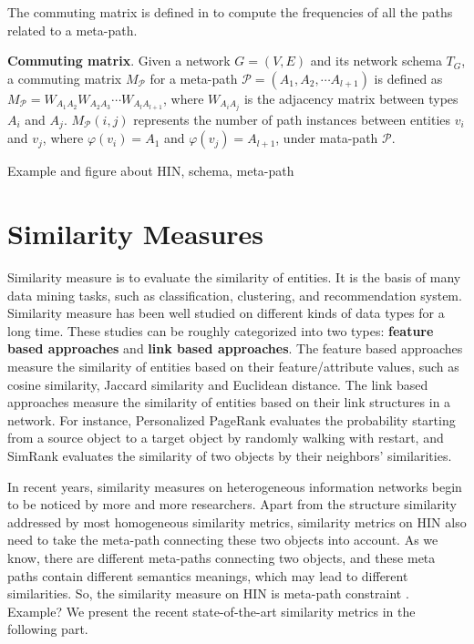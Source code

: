 \documentclass{acm_proc_article-csis8101}
\begin{document}
The commuting matrix is defined in \cite{sun2011pathsim} to compute the frequencies of all the paths related to a meta-path.

\begin{definition}
{\bf Commuting matrix}. Given a network $G=(V,E)$ and its network schema $T_{G}$, a commuting matrix $M_{\mathcal{P}}$ for a meta-path $\mathcal{P}=(A_{1}, A_{2}, \cdots A_{l+1})$ is defined as $M_{\mathcal{P}}=W_{A_{1}A_{2}}W_{A_{2}A_{3}} \cdots W_{A_{l}A_{l+1}}$, where $W_{A_{i}A_{j}}$ is the adjacency matrix between types $A_{i}$ and $A_{j}$. $M_{\mathcal{P}}(i, j)$ represents the number of path instances between entities $v_{i}$ and $v_{j}$, where $\varphi(v_{i})=A_{1}$ and $\varphi(v_{j})=A_{l+1}$, under mata-path $\mathcal{P}$.
\end{definition}

\begin{example}
{\color{red} Example and figure about HIN, schema, meta-path}
\end{example}

\section{Similarity Measures}

Similarity measure is to evaluate the similarity of entities. It is the basis of many data mining tasks, such as classification, clustering, and recommendation system. Similarity measure has been well studied on different kinds of data types for a long time. These studies can be roughly categorized into two types: {\bf feature based approaches} and {\bf link based approaches}. The feature based approaches measure the similarity of entities based on their feature/attribute values, such as cosine similarity, Jaccard similarity and Euclidean distance. The link based approaches measure the similarity of entities based on their link structures in a network. For instance, Personalized PageRank \cite{jeh2003scaling} evaluates the probability starting from a source object to a target object by randomly walking with restart, and SimRank\cite{jeh2002simrank} evaluates the similarity of two objects by their neighbors' similarities.

In recent years, similarity measures on heterogeneous information networks begin to be noticed by more and more researchers. Apart from the structure similarity addressed by most homogeneous similarity metrics, similarity metrics on HIN also need to take the meta-path connecting these two objects into account. As we know, there are different meta-paths connecting two objects, and these meta paths contain different semantics meanings, which may lead to different similarities. So, the similarity measure on HIN is meta-path constraint \cite{shi2017survey}. {\color{red} Example?} We present the recent state-of-the-art similarity metrics in the following part.
\end{document}
